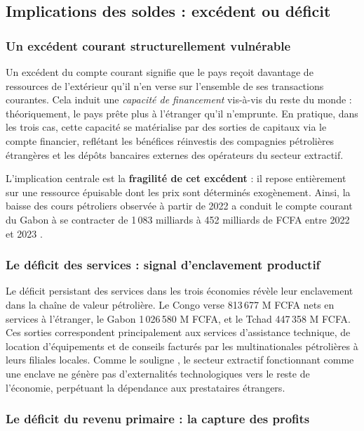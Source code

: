 \documentclass[12pt,a4paper]{article}
\begin{document}
\subsection{Implications des soldes : excédent ou déficit}

\subsubsection{Un excédent courant structurellement vulnérable}

Un excédent du compte courant signifie que le pays reçoit davantage de ressources de
l'extérieur qu'il n'en verse sur l'ensemble de ses transactions courantes. Cela induit
une \textit{capacité de financement} vis-à-vis du reste du monde : théoriquement, le pays
prête plus à l'étranger qu'il n'emprunte. En pratique, dans les trois cas, cette capacité
se matérialise par des sorties de capitaux via le compte financier, reflétant les bénéfices
réinvestis des compagnies pétrolières étrangères et les dépôts bancaires externes des
opérateurs du secteur extractif.

L'implication centrale est la \textbf{fragilité de cet excédent} : il repose entièrement
sur une ressource épuisable dont les prix sont déterminés exogènement. Ainsi, la baisse des
cours pétroliers observée à partir de 2022 a conduit le compte courant du Gabon à se
contracter de 1\,083 milliards à 452 milliards de FCFA entre 2022 et 2023
\parencite{beac2023rapport}.

\subsubsection{Le déficit des services : signal d'enclavement productif}

Le déficit persistant des services dans les trois économies révèle leur enclavement dans la
chaîne de valeur pétrolière. Le Congo verse 813\,677 M FCFA nets en services à l'étranger,
le Gabon 1\,026\,580 M FCFA, et le Tchad 447\,358 M FCFA. Ces sorties correspondent
principalement aux services d'assistance technique, de location d'équipements et de conseils
facturés par les multinationales pétrolières à leurs filiales locales. Comme le souligne
\textcite{cordenneary1982}, le secteur extractif fonctionnant comme une enclave ne génère
pas d'externalités technologiques vers le reste de l'économie, perpétuant la dépendance
aux prestataires étrangers.

\subsubsection{Le déficit du revenu primaire : la capture des profits}
\end{document}
